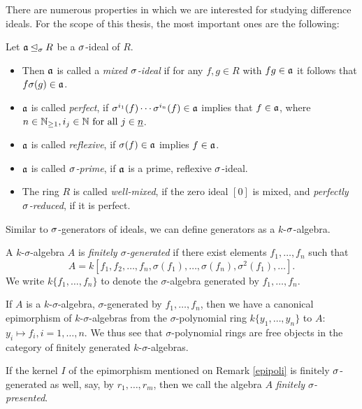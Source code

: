 \indent There are numerous properties in which we are interested for studying difference ideals. For the scope of this thesis, the most important ones are the following:
\begin{defn}\label{idealprops}
Let  $\mathfrak{a} \unlhd_{\sigma} R$ be a $\sigma$-ideal of $R$. 
\begin{itemize}
\item Then $\mathfrak{a}$ is called a \emph{mixed $\sigma$-ideal} if for any $f,g \in R$ with $fg \in \mathfrak{a}$ it follows that $f \sigma(g) \in \mathfrak{a}$. 
\item $\mathfrak{a}$ is called \emph{perfect}, if $\sigma^{i_1}(f) \cdots \sigma^{i_n}(f) \in \mathfrak{a}$ implies that $f \in \mathfrak{a}$, where $n \in \mathbb{N}_{\geq1}, i_j \in \mathbb{N} \text{ for all } j \in \underline{n}$. 
\item $\mathfrak{a}$ is called \emph{reflexive}, if $\sigma(f) \in \mathfrak{a}$ implies $f \in \mathfrak{a}$. 
\item $\mathfrak{a}$ is called \emph{$\sigma$-prime}, if $\mathfrak{a}$ is a prime, reflexive $\sigma$-ideal. 
\item The ring $R$ is called \emph{well-mixed}, if the zero ideal $[0]$ is mixed, and \emph{perfectly $\sigma$-reduced}, if it is perfect. 
\end{itemize}
\end{defn}

Similar to $\sigma$-generators of ideals, we can define generators as a $k$-$\sigma$-algebra.

\begin{defn}
A $k$-$\sigma$-algebra  $A$ is \emph{finitely $\sigma$-generated} if there exist elements $f_1, \ldots, f_n$ such that $$A = k[f_1,f_2,\ldots,f_n,\sigma(f_1),\ldots,\sigma(f_n),\sigma^2(f_1),\ldots].$$
We write  $k\{f_1, \ldots, f_n\}$ to denote the  $\sigma$-algebra generated by $f_1, \ldots, f_n$.
\end{defn}

\begin{rem}\label{epipoli}
If $A$ is a $k$-$\sigma$-algebra, $\sigma$-generated by $f_1, \ldots, f_n$, then we have a canonical epimorphism of $k$-$\sigma$-algebras from the $\sigma$-polynomial ring $k\{y_1, \ldots, y_n \}$ to $A$: $y_i \mapsto f_i, i = 1, \ldots, n$. We thus see that $\sigma$-polynomial rings are free objects in the category of finitely generated $k$-$\sigma$-algebras. 
\end{rem}

\begin{defn}
If the kernel $I$ of the epimorphism mentioned on Remark \ref{epipoli} is finitely $\sigma$-generated as well, say, by $r_1, \ldots, r_m$, then we call the algebra $A$ \emph{finitely $\sigma$-presented}. 
\end{defn}

